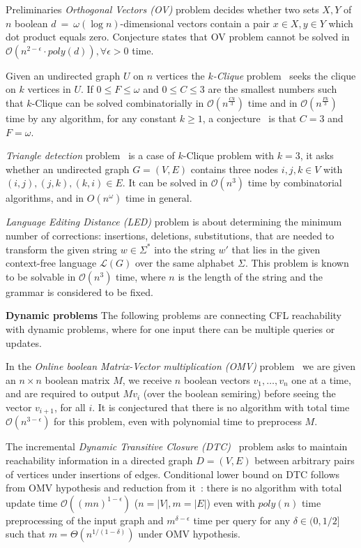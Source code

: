 \documentclass[12pt]{article}
\begin{document}
\begin{section}{Preliminaries}
	\emph{Orthogonal Vectors (OV)} problem decides whether two sets $X, Y$ of $n$ boolean $d~=~\omega(\log n)$-dimensional vectors contain a pair $x \in X, y \in Y$ which dot product equals zero. Conjecture states that OV problem cannot be solved in $\mathcal{O}(n^{2 - \epsilon} \cdot poly(d)), \forall \epsilon > 0$ time. 
	
	Given an undirected graph $U$ on $n$ vertices the \emph{$k$-Clique} problem~\cite{abboud2018if} seeks the clique on $k$ vertices in $U$.  If $0 \leq F \leq \omega$ and $0 \leq C \leq 3$ are the smallest numbers such that $k$-Clique can be solved combinatorially in $\mathcal{O}(n^{\frac{Ck}{3}})$ time and in $\mathcal{O}(n^{\frac{Fk}{3}})$ time by any algorithm, for any constant $k \geq 1$, a conjecture~\cite{williams2018some} is that $C = 3$ and $F = \omega$.
	
	\emph{Triangle detection} problem~\cite{hansen2021tight} is a case of $k$-Clique problem with $k=3$, it asks whether an undirected graph $G = (V , E)$ contains three nodes $i, j, k \in V$ with $(i,j),(j,k),(k,i) \in E$. It can be solved in $\mathcal{O}(n^3)$ time by combinatorial algorithms, and in $O(n^{\omega})$ time in general. 
	
	\emph{Language Editing Distance (LED)} problem is about determining the minimum number of corrections: insertions, deletions, substitutions, that are needed to transform the given string $w \in \Sigma^*$ into the string $w'$ that lies in the given context-free language $\mathcal{L}(G)$ over the same alphabet $\Sigma$. This problem is known~\cite{10.1137/0201022} to be solvable in $\mathcal{O}(n^3)$ time, where $n$ is the length of the string and the grammar is considered to be fixed.
	
\textbf{Dynamic problems}
	The following problems are connecting CFL reachability with dynamic problems, where for one input there can be multiple queries or updates. 
	
	In the \emph{Online boolean Matrix-Vector multiplication (OMV)} problem~\cite{10.1145/2746539.2746609} we are given an $n \times n$ boolean matrix $M$, we receive $n$ boolean vectors $v_1, \ldots, v_n$ one at a time, and are required to output $Mv_i$ (over the boolean semiring) before seeing the vector $v_{i+1}$, for all $i$. It is conjectured that there is no algorithm with total time $\mathcal{O}(n^{3-\epsilon})$ for this problem, even with polynomial time to preprocess $M$.
	
	The incremental \emph{Dynamic Transitive Closure (DTC)}~\cite{Hanauer2020FasterFD} problem asks to maintain reachability information in a directed graph $D = (V, E)$ between arbitrary pairs of vertices under insertions of edges. Conditional lower bound on DTC follows from OMV hypothesis and reduction from it~\cite{10.1145/2746539.2746609}: there is no algorithm with total update time $\mathcal{O}((mn)^{1 - \epsilon})$ ($n = |V|, m = |E|$) even with $poly(n)$ time preprocessing of the input graph and $m^{\delta - \epsilon}$ time per query for any $\delta \in (0, 1/2]$ such that $m = \Theta(n^{1/(1-\delta)})$ under OMV hypothesis.
	

\end{section}
\end{document}
